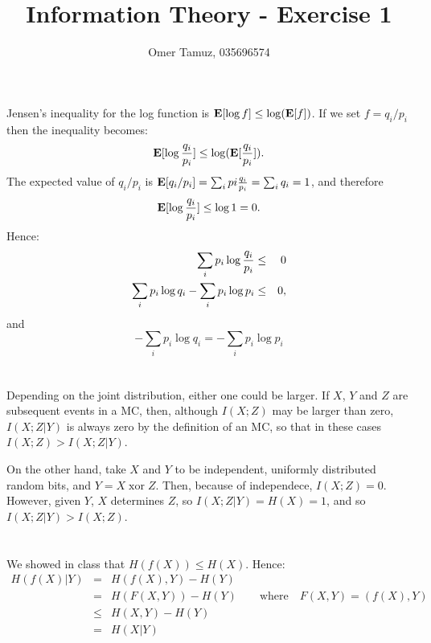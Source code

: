 \documentclass[11pt]{article} \usepackage{amssymb}
\newcommand{\E}{{\bf E}} \newcommand{\Cov}{{\bf Cov}}
\begin{document}
\title{Information Theory - Exercise 1}

 \author{Omer Tamuz, 035696574}
\maketitle

\section{}
Jensen's inequality for the log function is $\E[\log f] \leq \log(\E[f])$. If we set
$f=q_i/p_i$ then the inequality becomes:
\begin{equation*}
  \E[\log {q_i \over p_i}] \leq \log(\E[{q_i\over p_i}]).
\end{equation*}
The expected value of $q_i/p_i$ is 
$\E[q_i/p_i]=\sum_ipi{q_i\over p_i}=\sum_iq_i=1$, and therefore
\begin{equation*}
  \E[\log {q_i \over p_i}] \leq \log 1 = 0.
\end{equation*}
Hence:
\begin{eqnarray*}
  \sum_ip_i\log{q_i\over p_i}&\leq&0\\
  \sum_ip_i\log q_i-\sum_ip_i\log p_i&\leq&0,
\end{eqnarray*}
and
\begin{equation*}
  -\sum_ip_i\log q_i=-\sum_ip_i\log p_i  
\end{equation*}
\section{}
\section{}
Depending on the joint distribution, either one could be larger. If $X$,
$Y$ and $Z$ are subsequent events in a MC, then, although $I(X;Z)$ may
be larger than zero, $I(X;Z|Y)$ is always zero by the definition of an
MC, so that in these cases $I(X;Z)>I(X;Z|Y)$.

On the other hand, take $X$ and $Y$ to be independent, uniformly distributed
random bits, and $Y = X\; \mbox{xor}\; Z$. Then, because of independece, $I(X;Z)=0$.
However, given $Y$, $X$ determines $Z$, so $I(X;Z|Y)=H(X)=1$, and
so $I(X;Z|Y)>I(X;Z)$.

\section{}
We showed in class that $H(f(X)) \leq H(X)$. Hence:
\begin{eqnarray*}
  H(f(X)|Y)
  &=& H(f(X), Y) - H(Y)\\
  &=& H(F(X,Y)) - H(Y)\quad\quad \mbox{where}\quad F(X,Y) = (f(X),Y)\\
  &\leq& H(X,Y) - H(Y)\\
  &=& H(X|Y)
\end{eqnarray*}
\end{document}
